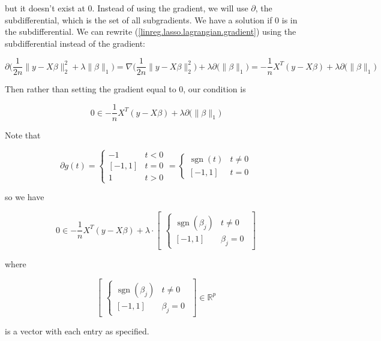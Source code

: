 but it doesn't exist at 0. Instead of using the gradient, we will use \(\partial\), the subdifferential, which is the set of all subgradients. We have a solution if 0 is in the subdifferential. We can rewrite (\ref{linreg.lasso.lagrangian.gradient}) using the subdifferential instead of the gradient:

\[
\partial \bigg(  \frac{1}{2n}\lVert y - X \beta \rVert_2^2   + \lambda \lVert \beta \rVert_1 \bigg) = \nabla \bigg(  \frac{1}{2n}\lVert y - X \beta \rVert_2^2  \bigg)  + \lambda \partial \big( \lVert \beta \rVert_1 \big)  =  - \frac{1}{n} X^T(y - X \beta) + \lambda \partial \big( \lVert \beta \rVert_1 \big)
\]

Then rather than setting the gradient equal to 0, our condition is

\[
0 \in - \frac{1}{n} X^T(y - X \beta) + \lambda \partial \big( \lVert \beta \rVert_1 \big)
\]

Note that 

\[
\partial g (t) = \begin{cases}
-1 & t < 0 \\
[-1, 1] & t = 0 \\
1 & t > 0
\end{cases} = \begin{cases}
\operatorname{sgn}(t) & t \neq 0 \\
[-1, 1] & t = 0 
\end{cases}
\]

so we have

\begin{equation}\label{linreg.lasso.soln.cond}
0 \in - \frac{1}{n} X^T(y - X \beta) + \lambda \cdot \begin{bmatrix} \begin{cases}
\operatorname{sgn}(\beta_j) & t \neq 0 \\
[-1, 1] & \beta_j = 0 
\end{cases} \end{bmatrix}
\end{equation}

where 

\[
\begin{bmatrix} \begin{cases}
\operatorname{sgn}(\beta_j) & t \neq 0 \\
[-1, 1] & \beta_j = 0 
\end{cases} \end{bmatrix} \in \mathbb{R}^p
\]

is a vector with each entry as specified.

